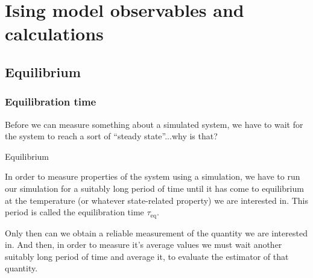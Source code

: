 \documentclass[hyperref={colorlinks=true}]{beamer}
\begin{document}
\section[Ising model observables and calculations]{Ising model observables and calculations}

\subsection[Equilibrium]{Equilibrium}

\begin{frame}%
  \frametitle{Equilibration time}
  
  Before we can  measure something about a simulated system, we have to wait for the system to reach a sort of ``steady state''...why is that?
  
  \pause
  
  \vspace{0.3cm}
  
  \begin{ucblock}{}
    \centering \LARGE Equilibrium
  \end{ucblock}
  
  \vspace{0.3cm}
  
  \pause
  
  In order to measure properties of the system using a simulation, we have to run our simulation for a suitably long period of time until it has come to equilibrium at the temperature (or whatever state-related property) we are interested in. This period is called the equilibration time $\tau_{\mathrm{eq}}$. 
  
  \vspace{0.3cm}
  
  Only then can we obtain a reliable measurement of the quantity we are interested in. And then, in order to measure it's average values we must wait another suitably long period of time and average it, to evaluate the estimator of that quantity. 
  
\end{frame}

\end{document}
